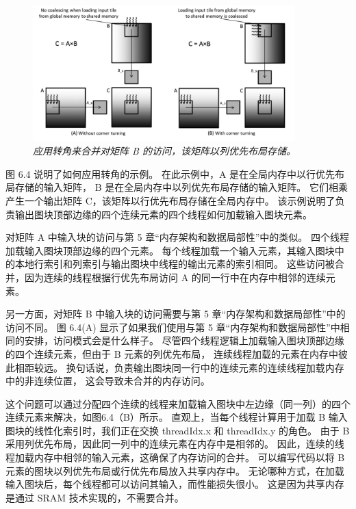 \begin{figure}[H]
	\centering
	\includegraphics[width=0.9\textwidth]{figs/F6.4.png}
	\caption{\textit{应用转角来合并对矩阵 B 的访问，该矩阵以列优先布局存储。}}
\end{figure}

图 6.4 说明了如何应用转角的示例。 在此示例中，A 是在全局内存中以行优先布局存储的输入矩阵，
B 是在全局内存中以列优先布局存储的输入矩阵。 它们相乘产生一个输出矩阵 C，该矩阵以行优先布局存储在全局内存中。 
该示例说明了负责输出图块顶部边缘的四个连续元素的四个线程如何加载输入图块元素。

对矩阵 A 中输入块的访问与第 5 章“内存架构和数据局部性”中的类似。 四个线程加载输入图块顶部边缘的四个元素。 
每个线程加载一个输入元素，其输入图块中的本地行索引和列索引与输出图块中线程的输出元素的索引相同。 
这些访问被合并，因为连续的线程根据行优先布局访问 A 的同一行中在内存中相邻的连续元素。

另一方面，对矩阵 B 中输入块的访问需要与第 5 章“内存架构和数据局部性”中的访问不同。 
图 6.4(A) 显示了如果我们使用与第 5 章“内存架构和数据局部性”中相同的安排，访问模式会是什么样子。 
尽管四个线程逻辑上加载输入图块顶部边缘的四个连续元素，但由于 B 元素的列优先布局，
连续线程加载的元素在内存中彼此相距较远。 换句话说，负责输出图块同一行中的连续元素的连续线程加载内存中的非连续位置，
这会导致未合并的内存访问。

这个问题可以通过分配四个连续的线程来加载输入图块中左边缘（同一列）的四个连续元素来解决，如图6.4（B）所示。 
直观上，当每个线程计算用于加载 B 输入图块的线性化索引时，我们正在交换 threadIdx.x 和 threadIdx.y 的角色。 
由于 B 采用列优先布局，因此同一列中的连续元素在内存中是相邻的。 
因此，连续的线程加载内存中相邻的输入元素，这确保了内存访问的合并。 
可以编写代码以将 B 元素的图块以列优先布局或行优先布局放入共享内存中。 
无论哪种方式，在加载输入图块后，每个线程都可以访问其输入，而性能损失很小。 
这是因为共享内存是通过 SRAM 技术实现的，不需要合并。

